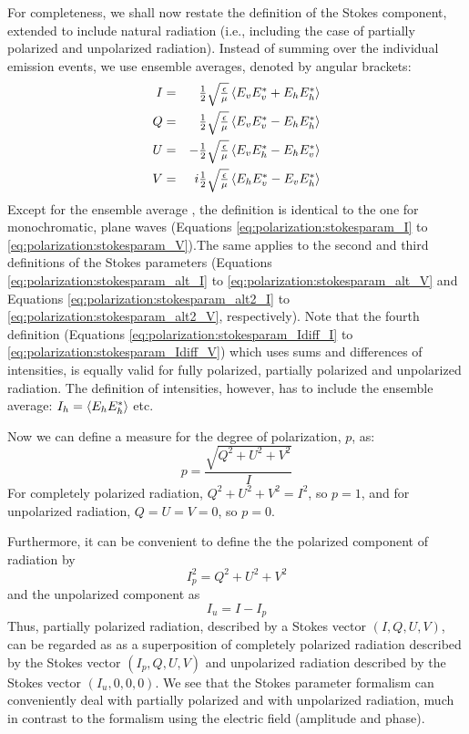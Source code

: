 For completeness, we shall now restate the definition of the Stokes
component, extended to include natural radiation (i.e., including the
case of partially polarized and unpolarized radiation).
Instead of summing over the individual emission events, we use
ensemble averages, denoted by angular brackets:
\begin{eqnarray}
  \label{eq:polarization:stokesparam_I_general}
  I &=& \textstyle\frac{1}{2}\sqrt{\textstyle{\frac{\epsilon}{\mu}}}  \left\langle E_v E_v^\ast + E_h E_h^\ast \right\rangle \\
  \label{eq:polarization:stokesparam_Q_general}
  Q &=&  \textstyle\frac{1}{2}\sqrt{\textstyle{\frac{\epsilon}{\mu}}} \left\langle   E_v E_v^\ast - E_h E_h^\ast \right\rangle \\
  \label{eq:polarization:stokesparam_U_general}
  U &=& - \textstyle\frac{1}{2}\sqrt{\textstyle{\frac{\epsilon}{\mu}}} \left\langle   E_v E_h^\ast - E_h E_v^\ast \right\rangle \\
  \label{eq:polarization:stokesparam_V_general}
  V &=& i \textstyle\frac{1}{2}\sqrt{\textstyle{\frac{\epsilon}{\mu}}} \left\langle E_h E_v^\ast - E_v E_h^\ast \right\rangle
\end{eqnarray}
Except for the ensemble average , the definition is
identical to the one for monochromatic, plane waves
(Equations \ref{eq:polarization:stokesparam_I}
to \ref{eq:polarization:stokesparam_V}).The same applies to the second
and third definitions of the Stokes parameters (Equations \ref{eq:polarization:stokesparam_alt_I}
to \ref{eq:polarization:stokesparam_alt_V} and  
Equations \ref{eq:polarization:stokesparam_alt2_I}
to \ref{eq:polarization:stokesparam_alt2_V}, respectively).
Note that the fourth definition (Equations \ref{eq:polarization:stokesparam_Idiff_I}
to \ref{eq:polarization:stokesparam_Idiff_V}) which uses sums and
differences of intensities, is equally valid for fully polarized,
partially polarized and unpolarized radiation. The definition of
intensities, however, has to include the ensemble average: $I_h =
\left\langle E_h E_h^\ast \right\rangle$ etc.

Now we can define a measure for
the degree of polarization, $p$, as:
\begin{equation}
  \label{eq:polarization:pol_degree}
  p = \frac{\sqrt{Q^2 + U^2 + V^2}}{I}
\end{equation}
For completely polarized radiation, $Q^2 + U^2 + V^2 = I^2$, so $p =
1$, and for unpolarized radiation, $Q = U = V = 0$, so $p = 0$.

Furthermore, it can be convenient to define the the polarized
component of radiation by
\begin{equation}
  \label{eq:polarization:pol_component}
  I_p^2 = Q^2 + U^2 + V^2
\end{equation}
and the unpolarized component as
\begin{equation}
  \label{eq:polarization:unpol_component}
  I_u = I - I_p
\end{equation}
Thus, partially polarized radiation, described by a Stokes vector $(I,
Q, U, V)$, can be regarded as as a superposition of completely
polarized radiation described by the Stokes vector $(I_p, Q, U, V)$
and unpolarized radiation described by the Stokes vector $(I_u,
0,0,0)$.  We see that the Stokes parameter formalism can conveniently
deal with partially polarized and with unpolarized radiation, much in
contrast to the formalism using the electric field (amplitude and
phase).

